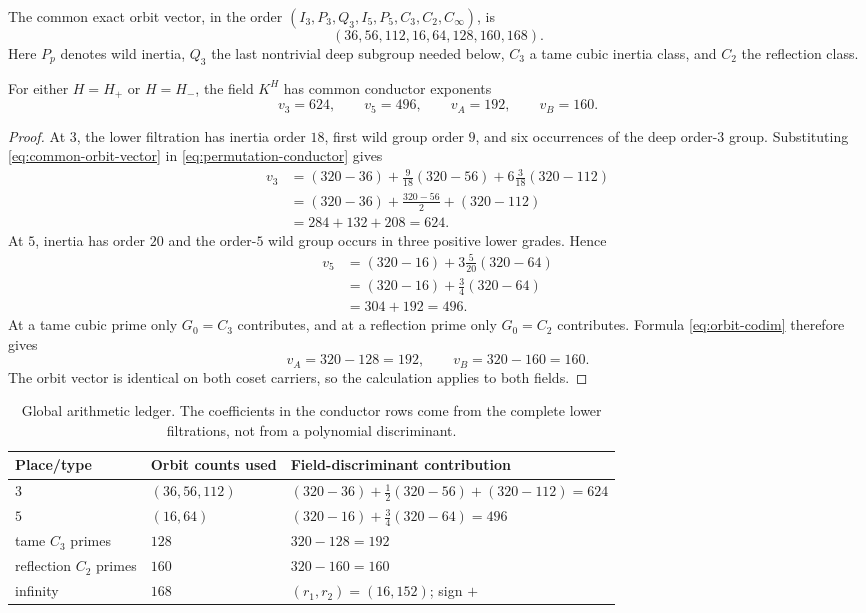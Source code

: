 The common exact orbit vector, in the order
$(I_3,P_3,Q_3,I_5,P_5,C_3,C_2,C_\infty)$, is
\begin{equation}
 (36,56,112,16,64,128,160,168).
 \label{eq:common-orbit-vector}
\end{equation}
Here $P_p$ denotes wild inertia, $Q_3$ the last nontrivial deep subgroup
needed below, $C_3$ a tame cubic inertia class, and $C_2$ the reflection
class.

\begin{proposition}
\label{prop:conductor-exponents}
For either $H=H_+$ or $H=H_-$, the field $K^H$ has common conductor
exponents
\[
 v_3=624,
 \qquad v_5=496,
 \qquad v_A=192,
 \qquad v_B=160.
\]
\end{proposition}

\begin{proof}
At $3$, the lower filtration has inertia order $18$, first wild group order
$9$, and six occurrences of the deep order-$3$ group.  Substituting
\eqref{eq:common-orbit-vector} in \eqref{eq:permutation-conductor} gives
\begin{align*}
 v_3
 &= (320-36)+\frac{9}{18}(320-56)
    +6\frac{3}{18}(320-112)\\
 &= (320-36)+\frac{320-56}{2}+(320-112)\\
 &=284+132+208=624.
\end{align*}
At $5$, inertia has order $20$ and the order-$5$ wild group occurs in three
positive lower grades.  Hence
\begin{align*}
 v_5
 &= (320-16)+3\frac{5}{20}(320-64)\\
 &= (320-16)+\frac34(320-64)\\
 &=304+192=496.
\end{align*}
At a tame cubic prime only $G_0=C_3$ contributes, and at a reflection prime
only $G_0=C_2$ contributes.  Formula \eqref{eq:orbit-codim} therefore gives
\[
 v_A=320-128=192,
 \qquad
 v_B=320-160=160.
\]
The orbit vector is identical on both coset carriers, so the calculation
applies to both fields.
\end{proof}

\FloatBarrier
\begin{table}[t]
\centering
\caption{Global arithmetic ledger.  The coefficients in the conductor rows
come from the complete lower filtrations, not from a polynomial
discriminant.}
\label{tab:global-ledger}
\begin{tabular}{@{}lll@{}}
\toprule
Place/type & Orbit counts used & Field-discriminant contribution\\
\midrule
$3$ & $(36,56,112)$ &
$(320-36)+\frac12(320-56)+(320-112)=624$\\
$5$ & $(16,64)$ &
$(320-16)+\frac34(320-64)=496$\\
tame $C_3$ primes & $128$ & $320-128=192$\\
reflection $C_2$ primes & $160$ & $320-160=160$\\
infinity & $168$ & $(r_1,r_2)=(16,152)$; sign $+$\\
\bottomrule
\end{tabular}
\end{table}
\FloatBarrier

